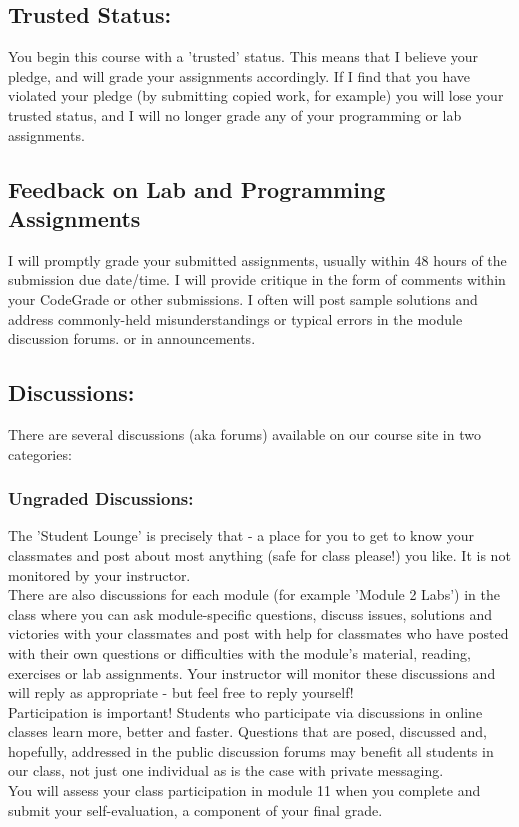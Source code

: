 \documentclass{article}
\begin{document}
\subsection{Trusted Status:}

You begin this course with a 'trusted' status. This means that I believe your pledge, and will grade your assignments accordingly. If I find that you have violated your pledge (by submitting copied work, for example) you will lose your trusted status, and I will no longer grade any of your programming or lab assignments.

\subsection{Feedback on Lab and Programming Assignments}

I will promptly grade your submitted assignments, usually within 48 hours of the submission due date/time.  I will provide critique in the form of comments within your CodeGrade or other submissions.  I often will post sample solutions and address commonly-held misunderstandings or typical errors in the module discussion forums. or in announcements.

\subsection{Discussions:}

There are several discussions (aka forums) available on our course site in two categories:

\subsubsection{Ungraded Discussions:}

The 'Student Lounge' is precisely that - a place for you to get to know your classmates and post about most anything (safe for class please!) you like. It is not monitored by your instructor.
\\
There are also discussions for each module (for example 'Module 2 Labs') in the class where you can ask module-specific questions, discuss issues, solutions and victories with your classmates and post with help for classmates who have posted with their own questions or difficulties with the module's material, reading, exercises or lab assignments.  Your instructor will monitor these discussions and will reply as appropriate - but feel free to reply yourself!
\\
Participation is important!  Students who participate via discussions in online classes learn more, better and faster.  Questions that are posed, discussed and, hopefully, addressed in the public discussion forums may benefit all students in our class, not just one individual as is the case with private messaging. 
\\
You will assess your class participation in module 11 when you complete and submit your self-evaluation, a component of your final grade.
\end{document}
